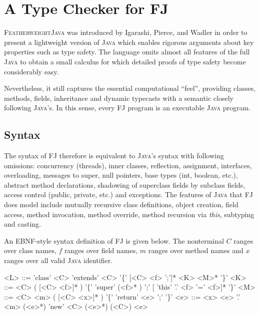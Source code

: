 \section{A Type Checker for FJ}

\textsc{FeatherweightJava} \cite{FJ01} was introduced by Igarashi,
Pierce, and Wadler in order to present a lightweight version of
\textsc{Java} which enables rigorous arguments about key properties
such as type safety. The language omits almost all features of the
full \textsc{Java} to obtain a small calculus for which detailed
proofs of type safety become considerably easy.

Nevertheless, it still captures the essential computational ``feel'',
providing classes, methods, fields, inheritance and dynamic typecasts
with a semantic closely following \textsc{Java}'s. In this sense,
every \textsc{FJ} program is an executable \textsc{Java} program.

\subsection{Syntax}

The syntax of \textsc{FJ} therefore is equivalent to \textsc{Java}'s
syntax with following omissions: concurrency (threads), inner classes,
reflection, assignment, interfaces, overloading, messages to super,
null pointers, base types (int, boolean, etc.), abstract method
declarations, shadowing of superclass fields by subclass fields,
access control (public, private, etc.) and exceptions. The features of
\textsc{Java} that \textsc{FJ} does model include mutually recursive
class definitions, object creation, field access, method invocation,
method override, method recursion via \textit{this}, subtyping and
casting.

An EBNF-style syntax definition of \textsc{FJ} is given below. The
nonterminal $C$ ranges over class names, $f$ ranges over field names,
$m$ ranges over method names and $x$ ranges over all valid
\textsc{Java} identifier.

\begin{displaygrammar}
<L> ::= 'class' <C> 'extends' <C> '\{' [<C> <f> ';']* <K> <M>* '\}'
<K> ::= <C> ( [<C> <f>]* ) '\{' 'super' (<f>* ) ';' [ 'this' '.' <f> '=' <f>]* '\}'
<M> ::= <C> <m> ( [<C> <x>]* ) '\{' 'return' <e> ';' '\}'
<e> ::= <x> \mid <e> '.' <m> (<e>*) \mid 'new' <C> (<e>*) \mid (<C>) <e>

\end{displaygrammar}

